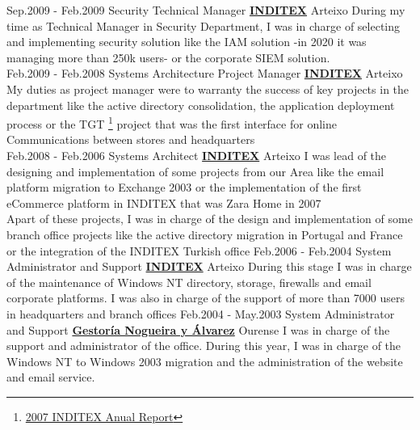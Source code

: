 \documentclass[a4paper]{twentysecondcv} %
\begin{document}
\begin{twenty}  
\twentyitem
    	{Sep.2009 -}
		{Feb.2009}
        {Security Technical Manager}
        {\href{https://www.inditex.com/}{\textbf{INDITEX}}}
        {Arteixo}
        {
        During my time as Technical Manager in Security Department, I was in charge of selecting and implementing security solution like the IAM solution -in 2020 it was managing more than 250k users- or the corporate SIEM solution. 
        }
        \\      
\twentyitem
    	{Feb.2009 -}
		{Feb.2008}
        {Systems Architecture Project Manager}
        {\href{https://www.inditex.com/}{\textbf{INDITEX}}}
        {Arteixo}
        {
        My duties as project manager were to warranty the success of key projects in the department like the active directory consolidation, the application deployment process or the TGT \footnote{\href {https://www.inditex.com/documents/10279/245898/Memoria_Anual_2007.pdf/74c34dcb-6502-4078-a13c-a4d50c55676b}{2007 INDITEX Anual Report}} project that was the first interface for online Communications between stores and headquarters 
        }
        \\
\twentyitem
    	{Feb.2008 -}
		{Feb.2006}
        {Systems Architect}
        {\href{https://www.inditex.com/}{\textbf{INDITEX}}}
        {Arteixo}
        {
        I was lead of the designing and implementation of some projects from our Area like the email platform migration to Exchange 2003 or the implementation of the first eCommerce platform in INDITEX that was Zara Home in 2007\\
        Apart of these projects, I was in charge of the design and implementation of some branch office projects like the active directory migration in Portugal and France or the integration of the INDITEX Turkish office
        }
\twentyitem
    	{Feb.2006 -}
		{Feb.2004}
        {System Administrator and Support}
        {\href{https://www.inditex.com/}{\textbf{INDITEX}}}
        {Arteixo}
        {
        During this stage I was in charge of the maintenance of Windows NT directory, storage, firewalls and email corporate platforms.\newline{}
        I was also in charge of the support of more than 7000 users in headquarters and branch offices
        }
\twentyitem
    	{Feb.2004 -}
		{May.2003}
        {System Administrator and Support}
        {\href{http://www.nogueirayalvarez.es/}{\textbf{Gestor\'ia Nogueira y \'Alvarez}}}
        {Ourense}
        {
        I was in charge of the support and administrator of the office. During this year, I was in charge of the Windows NT to Windows 2003 migration and the administration of the website and email service.
        }
\end{twenty}
\end{document}
